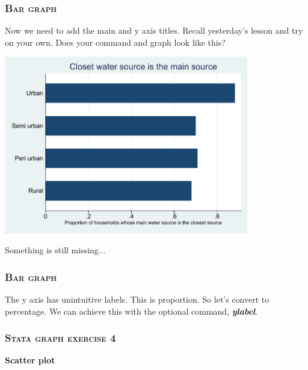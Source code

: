 \documentclass[10pt]{beamer}
\begin{document}
	\begin{frame}
	\frametitle{\textsc{Bar graph}}	
		 Now we need to add the main and y axis titles.
					 Recall yesterday's lesson and try on your own. \vspace{1mm}
		\onslide<2-> Does your command and graph look like this?
		
\begin{center}
    \includegraphics[width=0.8\textwidth]{bar_2.pdf}
\end{center}
			\vspace{1mm}
		 Something is still missing...
	\end{frame}

	\begin{frame}
	\frametitle{\textsc{Bar graph}}	
		 The y axis has unintuitive labels. This is proportion.
					 So let's convert to percentage. We can achieve this with 
					 the optional command, \textbf{\textit{ylabel}}. \vspace{1mm}
	
\begin{stlog}\end{stlog}
	\end{frame}
	
	\begin{frame}
	\frametitle{\textsc{Stata graph exercise 4}}
		\begin{center}
		\Large \textbf{Scatter plot}
		\end{center}
	\end{frame}		
	
\end{document}
